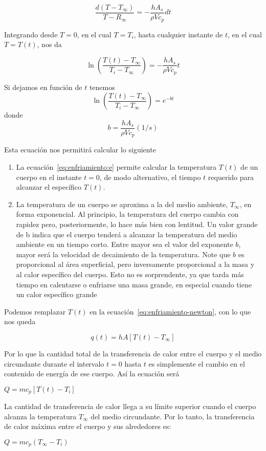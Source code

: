 \begin{equation*}
    \frac{d(T-T_\infty)}{T - R_\infty}
        = -\frac{hA_s}{\rho V c_p} dt
\end{equation*}

Integrando desde $T = 0$, en el cual $T = T_i$, hasta
cualquier instante de $t$, en el cual $T = T(t)$, nos da

\begin{equation}
    \label{eq:enfrimaiento:tiempo}
    \ln\left(\frac{T(t) - T_\infty}{T_i - T_\infty}\right)
     = - \frac{hA_s}{\rho V c_p}t
\end{equation}

Si dejamos en función de $t$ tenemos
\begin{equation}
    \label{eq:enfriamiento:e}
    \ln\left(\frac{T(t) - T_\infty}{T_i - T_\infty}\right)
        = e^{-bt}
\end{equation}
donde
\begin{equation}
    b = \frac{hA_s}{\rho V c_p} (1/s)
\end{equation}

Esta ecuación nos permitirá calcular lo siguiente

\begin{enumerate}
    \item La ecuación~\ref{eq:enfriamiento:e} permite
    calcular la temperatura $T(t)$ de un cuerpo en el
    instante $t = 0$, de modo alternativo, el tiempo $t$
    requerido para alcanzar el específico $T(t)$.
    \item La temperatura de un cuerpo se aproxima a la del medio ambiente, $T_\infty$, en
    forma exponencial. Al principio, la temperatura del cuerpo cambia con rapidez pero, posteriormente, lo hace más bien con lentitud. Un valor grande de b indica que el cuerpo tenderá a alcanzar la temperatura del medio
    ambiente en un tiempo corto. Entre mayor sea el valor del exponente $b$,
    mayor será la velocidad de decaimiento de la temperatura. Note que $b$ es
    proporcional al área superficial, pero inversamente proporcional a la masa y al calor específico del cuerpo. Esto no es sorprendente, ya que tarda
    más tiempo en calentarse o enfriarse una masa grande, en especial cuando tiene un calor específico grande
\end{enumerate}

Podemos remplazar $T(t)$ en la ecuación~\ref{eq:enfriamiento-newton}, 
con lo que nos queda

\begin{equation}
    \label{eq:enf:t}
    q(t) = hA[T(t) - T_\infty]
\end{equation}

Por lo que la cantidad total de la transferencia
de calor entre el cuerpo y el medio circundante
durante el intervalo $t = 0$ hasta $t$ es simplemente
el cambio en el contenido de energía de ese cuerpo.
Así la ecuación será

$Q = mc_p[T(t) - T_i]$

La cantidad de transferencia de calor llega a su límite superior
cuando el cuerpo alcanza la temperatura $T_\infty$ del medio
circundante. Por lo tanto, la transferencia de calor máxima
entre el cuerpo y sus alrededores es:

$Q = mc_p(T_\infty - T_i)$
